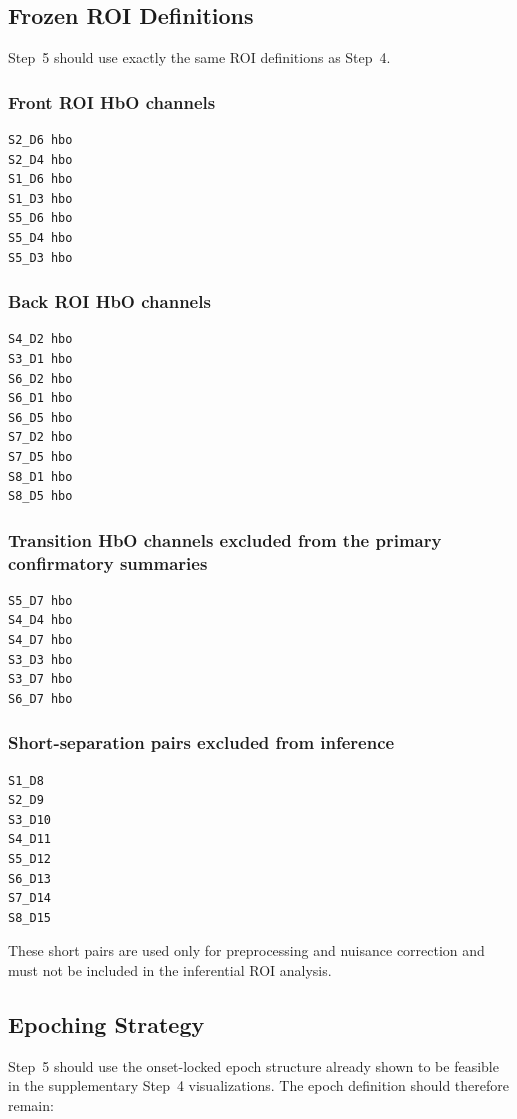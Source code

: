 \documentclass[11pt]{article}
\begin{document}
\subsection{Frozen ROI Definitions}
Step~5 should use exactly the same ROI definitions as Step~4.

\subsubsection{Front ROI HbO channels}
\begin{verbatim}
S2_D6 hbo
S2_D4 hbo
S1_D6 hbo
S1_D3 hbo
S5_D6 hbo
S5_D4 hbo
S5_D3 hbo
\end{verbatim}

\subsubsection{Back ROI HbO channels}
\begin{verbatim}
S4_D2 hbo
S3_D1 hbo
S6_D2 hbo
S6_D1 hbo
S6_D5 hbo
S7_D2 hbo
S7_D5 hbo
S8_D1 hbo
S8_D5 hbo
\end{verbatim}

\subsubsection{Transition HbO channels excluded from the primary confirmatory summaries}
\begin{verbatim}
S5_D7 hbo
S4_D4 hbo
S4_D7 hbo
S3_D3 hbo
S3_D7 hbo
S6_D7 hbo
\end{verbatim}

\subsubsection{Short-separation pairs excluded from inference}
\begin{verbatim}
S1_D8
S2_D9
S3_D10
S4_D11
S5_D12
S6_D13
S7_D14
S8_D15
\end{verbatim}

These short pairs are used only for preprocessing and nuisance correction and must not be included
in the inferential ROI analysis.

\subsection{Epoching Strategy}
Step~5 should use the onset-locked epoch structure already shown to be feasible in the supplementary
Step~4 visualizations.
The epoch definition should therefore remain:
\end{document}
